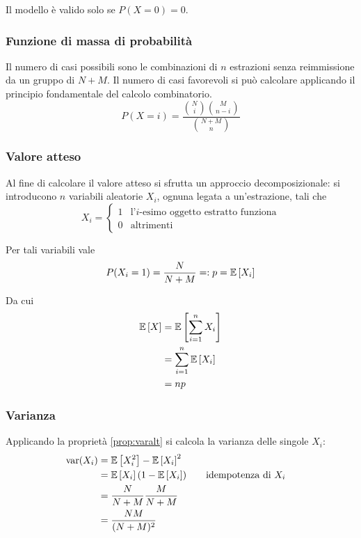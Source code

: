 Il modello è valido solo se $P(X=0)=0$.


\subsubsection{Funzione di massa di probabilità}
Il numero di casi possibili sono le combinazioni di $n$ estrazioni senza reimmissione da un gruppo di $N+M$. Il numero di casi favorevoli si può calcolare applicando il principio fondamentale del calcolo combinatorio.
\begin{equation*}
	P(X=i) = \frac{\binom{N}{i}\binom{M}{n-i}}{\binom{N+M}{n}}
\end{equation*}


\subsubsection{Valore atteso}
Al fine di calcolare il valore atteso si sfrutta un approccio decomposizionale: si introducono $n$ variabili aleatorie $X_i$, ognuna legata a un'estrazione, tali che
\begin{equation*}
	X_i = \begin{cases}
		1 & \text{l'$i$-esimo oggetto estratto funziona} \\
		0 & \text{altrimenti}
	\end{cases}
\end{equation*}

Per tali variabili vale
\begin{equation*}
	P(X_i=1) = \frac{N}{N+M} =: p = \mathbb{E}\left[ X_i \right]
\end{equation*}

Da cui
\begin{align*}
	\mathbb{E}\left[ X \right] & = \mathbb{E}\left[ \sum_{i=1}^n X_i \right] \\
	       & = \sum_{i=1}^n \mathbb{E}\left[ X_i \right] \\
	       & = np
\end{align*}


\subsubsection{Varianza}
Applicando la proprietà \ref{prop:varalt} si calcola la varianza delle singole $X_i$:
\begin{align*}
	\operatorname{var}(X_i) & = \mathbb{E}\left[ X_i^2 \right]-\mathbb{E}\left[ X_i \right]^2                                   \\
	          & = \mathbb{E}\left[ X_i \right](1-\mathbb{E}\left[ X_i \right])          & \quad & \text{idempotenza di $X_i$} \\
	          & = \frac{N}{N+M} \frac{M}{N+M}                           \\
	          & = \frac{NM}{(N+M)^2}
\end{align*}

